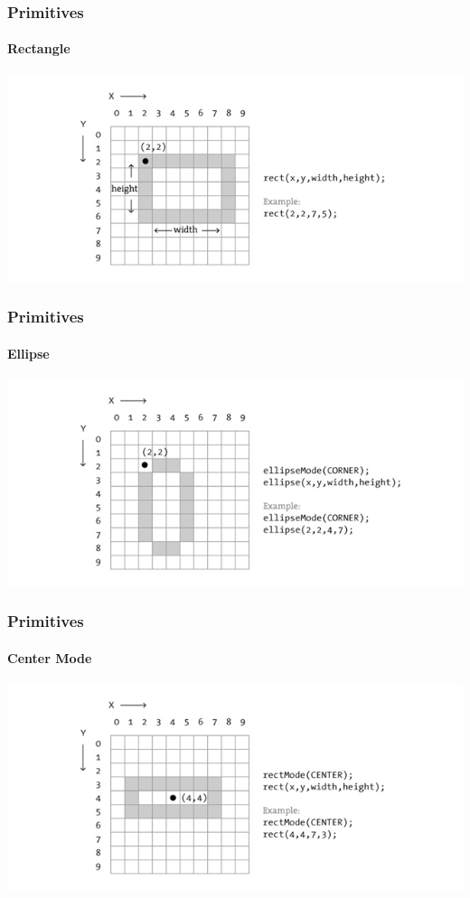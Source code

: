 \documentclass[xcolor=dvipsnames]{beamer}
\begin{document}
\begin{frame}
\frametitle{Primitives}
\framesubtitle{Rectangle}
\begin{center}
\includegraphics[width=\linewidth]{rect.jpg}
\end{center}
\end{frame}

\begin{frame}
\frametitle{Primitives}
\framesubtitle{Ellipse}
\begin{center}
\includegraphics[width=\linewidth]{ellipse.jpg}
\end{center}
\end{frame}

\begin{frame}
\frametitle{Primitives}
\framesubtitle{Center Mode}
\begin{center}
\includegraphics[width=\linewidth]{rectCenter.jpg}
\end{center}
\end{frame}
\end{document}

